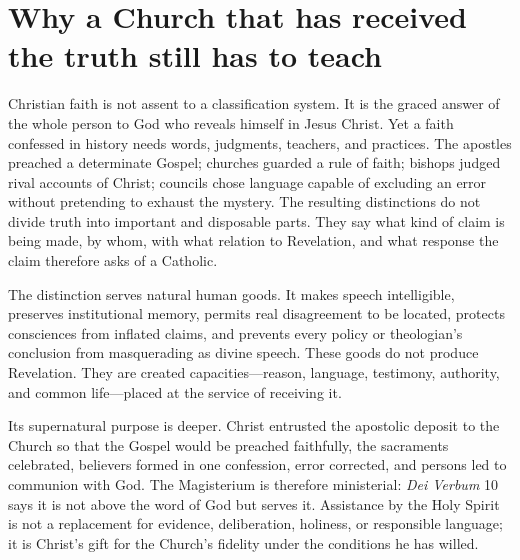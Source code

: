 
\section{Why a Church that has received the truth still has to teach}

Christian faith is not assent to a classification system. It is the graced
answer of the whole person to God who reveals himself in Jesus Christ. Yet a
faith confessed in history needs words, judgments, teachers, and practices.
The apostles preached a determinate Gospel; churches guarded a rule of faith;
bishops judged rival accounts of Christ; councils chose language capable of
excluding an error without pretending to exhaust the mystery. The resulting
distinctions do not divide truth into important and disposable parts. They say
what kind of claim is being made, by whom, with what relation to Revelation,
and what response the claim therefore asks of a Catholic.

The distinction serves natural human goods. It makes speech intelligible,
preserves institutional memory, permits real disagreement to be located,
protects consciences from inflated claims, and prevents every policy or
theologian's conclusion from masquerading as divine speech. These goods do not
produce Revelation. They are created capacities---reason, language, testimony,
authority, and common life---placed at the service of receiving it.

Its supernatural purpose is deeper. Christ entrusted the apostolic deposit to
the Church so that the Gospel would be preached faithfully, the sacraments
celebrated, believers formed in one confession, error corrected, and persons
led to communion with God. The Magisterium is therefore ministerial: \emph{Dei
Verbum} 10 says it is not above the word of God but serves it. Assistance by
the Holy Spirit is not a replacement for evidence, deliberation, holiness, or
responsible language; it is Christ's gift for the Church's fidelity under the
conditions he has willed.

